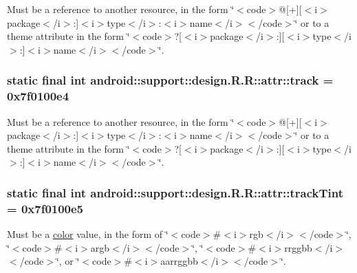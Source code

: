 Must be a reference to another resource, in the form \char`\"{}$<$code$>$@\mbox{[}+\mbox{]}\mbox{[}$<$i$>$package$<$/i$>$:\mbox{]}$<$i$>$type$<$/i$>$:$<$i$>$name$<$/i$>$$<$/code$>$\char`\"{} or to a theme attribute in the form \char`\"{}$<$code$>$?\mbox{[}$<$i$>$package$<$/i$>$:\mbox{]}\mbox{[}$<$i$>$type$<$/i$>$:\mbox{]}$<$i$>$name$<$/i$>$$<$/code$>$\char`\"{}. \hypertarget{classandroid_1_1support_1_1design_1_1_r_1_1attr_da223e379f6316dfc5ec62048deb40d2}{
\subsubsection[{track}]{\setlength{\rightskip}{0pt plus 5cm}static final int android::support::design.R.R::attr::track = 0x7f0100e4}}
\label{classandroid_1_1support_1_1design_1_1_r_1_1attr_da223e379f6316dfc5ec62048deb40d2}


Must be a reference to another resource, in the form \char`\"{}$<$code$>$@\mbox{[}+\mbox{]}\mbox{[}$<$i$>$package$<$/i$>$:\mbox{]}$<$i$>$type$<$/i$>$:$<$i$>$name$<$/i$>$$<$/code$>$\char`\"{} or to a theme attribute in the form \char`\"{}$<$code$>$?\mbox{[}$<$i$>$package$<$/i$>$:\mbox{]}\mbox{[}$<$i$>$type$<$/i$>$:\mbox{]}$<$i$>$name$<$/i$>$$<$/code$>$\char`\"{}. \hypertarget{classandroid_1_1support_1_1design_1_1_r_1_1attr_23ccd8ab58c44bfb92df9d350e2b8e0b}{
\subsubsection[{trackTint}]{\setlength{\rightskip}{0pt plus 5cm}static final int android::support::design.R.R::attr::trackTint = 0x7f0100e5}}
\label{classandroid_1_1support_1_1design_1_1_r_1_1attr_23ccd8ab58c44bfb92df9d350e2b8e0b}


Must be a \hyperlink{classandroid_1_1support_1_1design_1_1_r_1_1color}{color} value, in the form of \char`\"{}$<$code$>$\#$<$i$>$rgb$<$/i$>$$<$/code$>$\char`\"{}, \char`\"{}$<$code$>$\#$<$i$>$argb$<$/i$>$$<$/code$>$\char`\"{}, \char`\"{}$<$code$>$\#$<$i$>$rrggbb$<$/i$>$$<$/code$>$\char`\"{}, or \char`\"{}$<$code$>$\#$<$i$>$aarrggbb$<$/i$>$$<$/code$>$\char`\"{}. 

